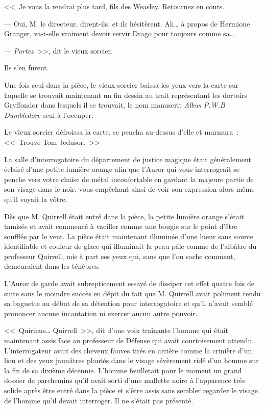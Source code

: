 <<~Je vous la rendrai plus tard, fils des Weasley. Retournez en cours.

--- Oui, M. le directeur, dirent-ils, et ils hésitèrent. Ah… à propos de Hermione Granger, va-t-elle vraiment devoir servir Drago pour toujours comme sa…

--- \emph{Partez}~>>, dit le vieux sorcier.

Ils s'en furent.

Une fois seul dans la pièce, le vieux sorcier baissa les yeux vers la carte sur laquelle se trouvait maintenant un fin dessin au trait représentant les dortoirs Gryffondor dans lesquels il se trouvait, le nom manuscrit \emph{Albus P.W.B Dumbledore} seul à l'occuper.

Le vieux sorcier défroissa la carte, se pencha au-dessus d'elle et murmura~: <<~Trouve Tom Jedusor.~>>

\later

La salle d'interrogatoire du département de justice magique était généralement éclairé d'une petite lumière orange afin que l'Auror qui vous interrogeait se penche vers votre chaise de métal inconfortable en gardant la majeure partie de son visage dans le noir, vous empêchant ainsi de voir son expression alors même qu'il voyait la vôtre.

Dès que M. Quirrell était entré dans la pièce, la petite lumière orange s'était tamisée et avait commencé à vaciller comme une bougie sur le point d'être soufflée par le vent. La pièce était maintenant illuminée d'une lueur sans source identifiable et couleur de glace qui illuminait la peau pâle comme de l'albâtre du professeur Quirrell, mis à part ses yeux qui, sans que l'on sache comment, demeuraient dans les ténèbres.

L'Auror de garde avait subrepticement essayé de dissiper cet effet quatre fois de suite sans le moindre succès en dépit du fait que M. Quirrell avait poliment rendu sa baguette au début de sa détention pour interrogatoire et qu'il n'avait semblé prononcer aucune incantation ni exercer aucun autre pouvoir.

<<~Quirinus… Quirrell~>>, dit d'une voix traînante l'homme qui était maintenant assis face au professeur de Défense qui avait courtoisement attendu. L'interrogateur avait des cheveux fauves tirés en arrière comme la crinière d'un lion et des yeux jaunâtres plantés dans le visage sévèrement ridé d'un homme sur la fin de sa dixième décennie. L'homme feuilletait pour le moment un grand dossier de parchemins qu'il avait sorti d'une mallette noire à l'apparence très solide après être entré dans la pièce et s'être assis sans sembler regarder le visage de l'homme qu'il devait interroger. Il ne s'était pas présenté.

